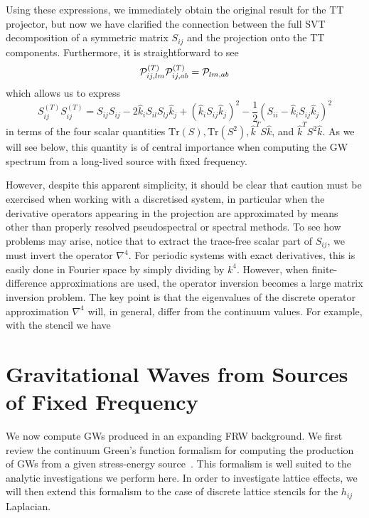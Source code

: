 \documentclass{revtex4}
\begin{document}
Using these expressions, we immediately obtain the original result for the TT projector,
but now we have clarified the connection between the full SVT decomposition of a symmetric matrix $S_{ij}$ and the projection onto the TT components.
Furthermore, it is straightforward to see
\begin{equation}
  \mathcal{P}_{ij,lm}^{(T)}\mathcal{P}_{ij,ab}^{(T)} = \mathcal{P}_{lm,ab}
\end{equation}
which allows us to express
\begin{equation}
  S_{ij}^{(T)}S_{ij}^{(T)} = S_{ij}S_{ij} - 2\hat{k}_iS_{il}S_{lj}\hat{k}_j + \left(\hat{k}_iS_{ij}\hat{k}_j\right)^2 - \frac{1}{2}\left(S_{ii}-\hat{k}_iS_{ij}\hat{k}_j\right)^2
\end{equation}
in terms of the four scalar quantities $\mathrm{Tr}(S), \mathrm{Tr}(S^2), \hat{k}^TS\hat{k}$, and $\hat{k}^TS^2\hat{k}$.
As we will see below, this quantity is of central importance when computing the GW spectrum from a long-lived source with fixed frequency.

However, despite this apparent simplicity, it should be clear that caution must be exercised when working with a discretised system, in particular when the derivative operators appearing in the projection are approximated by means other than properly resolved pseudospectral or spectral methods.
To see how problems may arise, notice that to extract the trace-free scalar part of $S_{ij}$, we must invert the operator $\nabla^4$.
For periodic systems with exact derivatives, this is easily done in Fourier space by simply dividing by $k^4$.
However, when finite-difference approximations are used, the operator inversion becomes a large matrix inversion problem.
The key point is that the eigenvalues of the discrete operator approximation $\nabla^4$ will, in general, differ from the continuum values.
For example, with the stencil
we have

\section{Gravitational Waves from Sources of Fixed Frequency}
We now compute GWs produced in an expanding FRW background.
We first review the continuum Green's function formalism for computing the production of GWs from a given stress-energy source~\cite{KofmanDufaux}.
This formalism is well suited to the analytic investigations we perform here.
In order to investigate lattice effects, we will then extend this formalism to the case of discrete lattice stencils for the $h_{ij}$ Laplacian.
\end{document}
